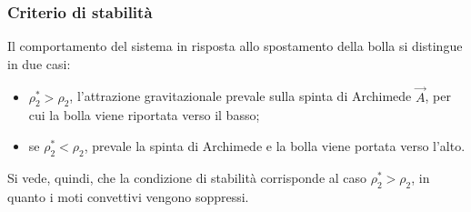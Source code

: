 \documentclass[11pt, a4paper]{scrartcl}
\theoremstyle{style}
\theoremstyle{style1}
\numberwithin{equation}{subsection}
\begin{document}
\subsubsection{Criterio di stabilit\`a}

Il comportamento del sistema in risposta allo spostamento della bolla si distingue in due casi:
\begin{itemize}
	\item $\rho _2^* > \rho _2$, l'attrazione gravitazionale prevale sulla spinta di Archimede $\vec{A}$, per cui la bolla viene riportata verso il basso;
	\item se $\rho _2^* < \rho _2$, prevale la spinta di Archimede e la bolla viene portata verso l'alto.
\end{itemize}
Si vede, quindi, che la condizione di stabilit\`a corrisponde al caso $\rho _2^* > \rho _2$, in quanto i moti convettivi vengono soppressi.
\end{document}
